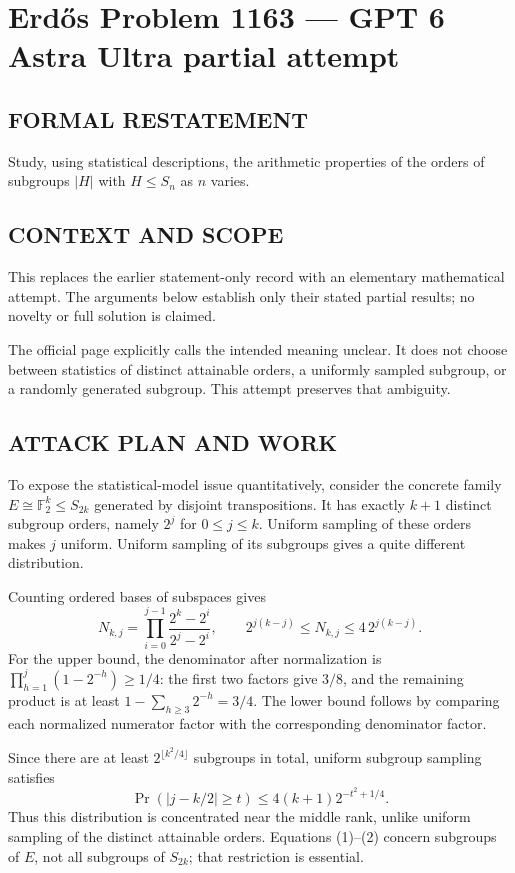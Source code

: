 \section*{Erd\H{o}s Problem 1163 --- GPT 6 Astra Ultra partial attempt}


\subsection*{FORMAL RESTATEMENT}
Study, using statistical descriptions, the arithmetic properties of the orders of subgroups $|H|$ with $H\leq S_n$ as $n$ varies.

\subsection*{CONTEXT AND SCOPE}
This replaces the earlier statement-only record with an elementary mathematical attempt. The arguments below establish only their stated partial results; no novelty or full solution is claimed.

The official page explicitly calls the intended meaning unclear. It does not choose between statistics of distinct attainable orders, a uniformly sampled subgroup, or a randomly generated subgroup. This attempt preserves that ambiguity.

\subsection*{ATTACK PLAN AND WORK}
To expose the statistical-model issue quantitatively, consider the concrete
family $E\cong\mathbb F_2^k\le S_{2k}$ generated by disjoint transpositions.
It has exactly $k+1$ distinct subgroup orders, namely $2^j$ for $0\le j\le k$.
Uniform sampling of these orders makes $j$ uniform. Uniform sampling of its
subgroups gives a quite different distribution.

Counting ordered bases of subspaces gives
\[N_{k,j}=\prod_{i=0}^{j-1}\frac{2^k-2^i}{2^j-2^i},\qquad
2^{j(k-j)}\le N_{k,j}\le4\,2^{j(k-j)}.\tag{1}\]
For the upper bound, the denominator after normalization is
$\prod_{h=1}^j(1-2^{-h})\ge1/4$: the first two factors give $3/8$, and the
remaining product is at least $1-\sum_{h\ge3}2^{-h}=3/4$.
The lower bound follows by comparing each normalized numerator factor with
the corresponding denominator factor.

Since there are at least $2^{\lfloor k^2/4\rfloor}$ subgroups in total,
uniform subgroup sampling satisfies
\[\Pr(|j-k/2|\ge t)\le4(k+1)2^{-t^2+1/4}.\tag{2}\]
Thus this distribution is concentrated near the middle rank, unlike uniform
sampling of the distinct attainable orders. Equations (1)--(2) concern subgroups
of $E$, not all subgroups of $S_{2k}$; that restriction is essential.


